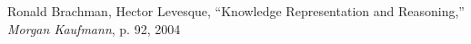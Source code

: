 \documentclass{article}
\begin{document}
\newpage

\begin{thebibliography}{1.7} 
 \color{cyan}Ronald Brachman, Hector Levesque, “Knowledge Representation and Reasoning,” \textit{Morgan Kaufmann}, p. 92, 2004 
\end{thebibliography}

\newpage

%
\makeatletter

\newcommand\PrologPredicateStyle{}
\newcommand\PrologVarStyle{}
\newcommand\PrologAnonymVarStyle{}
\newcommand\PrologAtomStyle{}
\newcommand\PrologOtherStyle{}
\newcommand\PrologCommentStyle{}

\newif\ifpredicate@prolog@
\newif\ifwithinparens@prolog@

\underscore@prolog

\newcount\currentchar@prolog

\newcommand\@testChar@prolog%
{%
  \ifnum\lst@mode=\lst@Pmode%
    \detectTypeAndHighlight@prolog%
  \else
    \ifwithinparens@prolog@%
      \detectTypeAndHighlight@prolog%
    \fi
  \fi
  \global\predicate@prolog@false%
}

\newcommand\detectTypeAndHighlight@prolog
{%
  \def\lst@thestyle{\PrologAtomStyle}%
  \ifpredicate@prolog@%
    \def\lst@thestyle{\PrologPredicateStyle}%
  \else
    \expandafter\splitfirstchar@prolog\expandafter{\the\lst@token}%
    \expandafter\ifx\@testChar@prolog\underscore@prolog%
      \ifnum\lst@length=1%
        \let\lst@thestyle\PrologAnonymVarStyle%
      \else
        \let\lst@thestyle\PrologVarStyle%
      \fi
    \else
      \currentchar@prolog=65
      \loop
        \expandafter\ifnum\expandafter`\@testChar@prolog=\currentchar@prolog%
          \let\lst@thestyle\PrologVarStyle%
          \let\iterate\relax
        \fi
        \advance \currentchar@prolog by 1
        \unless\ifnum\currentchar@prolog>90
      \repeat
    \fi
  \fi
}
\newcommand\splitfirstchar@prolog{}
\def\splitfirstchar@prolog#1{\@splitfirstchar@prolog#1\relax}
\newcommand\@splitfirstchar@prolog{}
\def\@splitfirstchar@prolog#1#2\relax{\def\@testChar@prolog{#1}}
\end{document}
